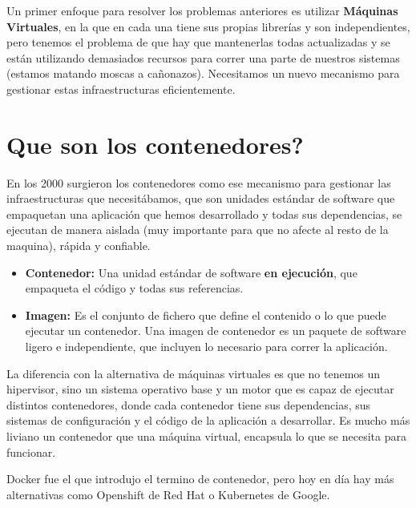 \documentclass[12pt]{report} %
\begin{document}
Un primer enfoque para resolver los problemas anteriores es utilizar \textbf{Máquinas Virtuales}, en la que en cada una tiene sus propias librerías y son independientes, pero tenemos el problema de que hay que mantenerlas todas actualizadas y se están utilizando demasiados recursos para correr una parte de nuestros sistemas (estamos matando moscas a cañonazos).
Necesitamos un nuevo mecanismo para gestionar estas infraestructuras eficientemente.

\section{Que son los contenedores?}
En los 2000 surgieron los contenedores como ese mecanismo para gestionar las infraestructuras que necesitábamos, que son unidades estándar de software que empaquetan una aplicación que hemos desarrollado y todas sus dependencias, se ejecutan de manera aislada (muy importante para que no afecte al resto de la maquina), rápida y confiable.

\begin{itemize}
	\item \textbf{Contenedor:} Una unidad estándar de software \textbf{en ejecución}, que empaqueta el código y todas sus referencias.
	\item \textbf{Imagen:} Es el conjunto de fichero que define el contenido o lo que puede ejecutar un contenedor.
	Una imagen de contenedor es un paquete de software ligero e independiente, que incluyen lo necesario para correr la aplicación.
\end{itemize}

La diferencia con la alternativa de máquinas virtuales es que no tenemos un hipervisor, sino un sistema operativo base y un motor que es capaz de ejecutar distintos contenedores, donde cada contenedor tiene sus dependencias, sus sistemas de configuración y el código de la aplicación a desarrollar. Es mucho más liviano un contenedor que una máquina virtual, encapsula lo que se necesita para funcionar.

Docker fue el que introdujo el termino de contenedor, pero hoy en día hay más alternativas como Openshift de Red Hat o Kubernetes de Google.
\end{document}
